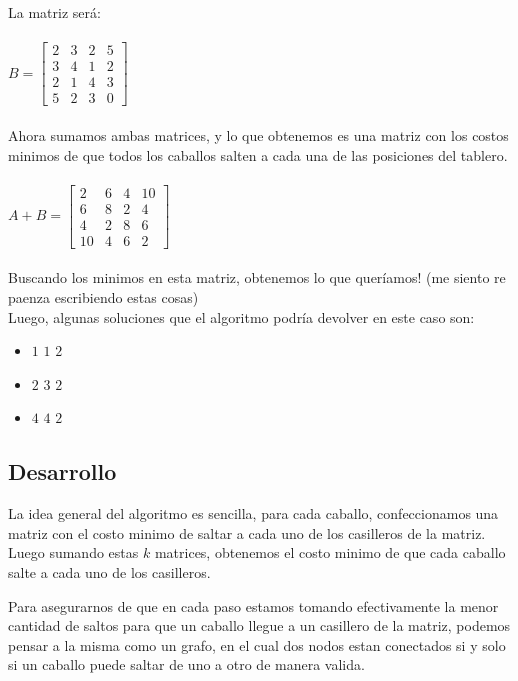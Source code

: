 La matriz será:
\\
\\
$B = \begin{bmatrix}
      2 & 3 & 2 & 5  \\[0.3em]
      3 & 4 & 1 & 2  \\[0.3em]
      2 & 1 & 4 & 3  \\[0.3em]
      5 & 2 & 3 & 0
\end{bmatrix}$
\\
\\
Ahora sumamos ambas matrices, y lo que obtenemos es una matriz con los costos minimos de que todos los caballos salten a cada una de las posiciones del tablero.
\\
\\
$A + B =  \begin{bmatrix}
          2 & 6 & 4 & 10 \\[0.3em]
          6 & 8 & 2 & 4 \\[0.3em]
          4 & 2 & 8 & 6 \\[0.3em]
          10 & 4 & 6 & 2 
          \end{bmatrix}
          $
\\
\\
Buscando los minimos en esta matriz, obtenemos lo que quer\'iamos! (me siento re paenza escribiendo estas cosas)
\\
Luego, algunas soluciones que el algoritmo podr\'ia devolver en este caso son:
\\
\begin{itemize}
\item $1$ $1$ $2$ 
\item $2$ $3$ $2$
\item $4$ $4$ $2$ 
\end{itemize}

\subsection{Desarrollo}
La idea general del algoritmo es sencilla, para cada caballo, confeccionamos una matriz con el costo minimo de saltar a cada uno de los casilleros de la matriz. Luego sumando estas $k$ matrices, obtenemos el costo minimo de que cada caballo salte a cada uno de los casilleros.

Para asegurarnos de que en cada paso estamos tomando efectivamente la menor cantidad de saltos para que un caballo llegue a un casillero de la matriz, podemos pensar a la misma como un grafo, en el cual dos nodos estan conectados si y solo si un caballo puede saltar de uno a otro de manera valida.

